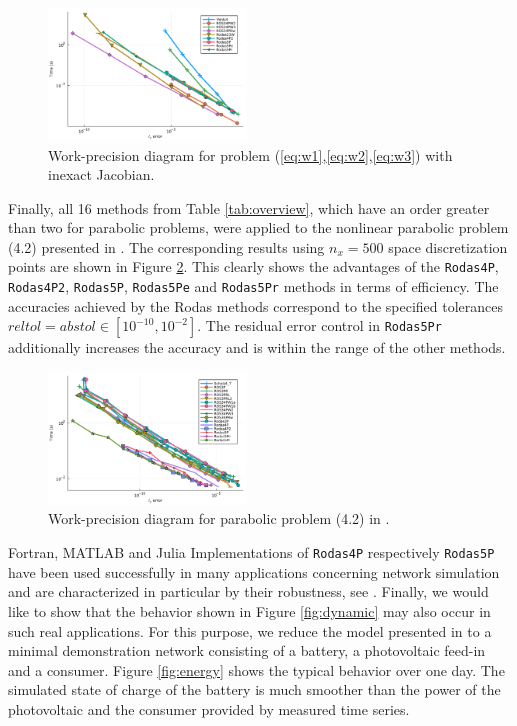 \documentclass{juliacon}
\begin{document}
\begin{figure}
 \centering
 \includegraphics[width=0.47\textwidth]{Abb4.pdf}
 \caption{Work-precision diagram for problem (\ref{eq:w1},\ref{eq:w2},\ref{eq:w3}) with inexact Jacobian.}\label{fig:benchW}
\end{figure}

Finally, all 16 methods from Table \ref{tab:overview}, which have an order greater than two for parabolic problems, were applied to the  
nonlinear parabolic problem (4.2) presented in \cite{rodas5p}. The corresponding results using $n_x=500$ space discretization points are shown in Figure \ref{fig:benchpara}. 
This clearly shows the advantages of the \verb|Rodas4P|, \verb|Rodas4P2|, \verb|Rodas5P|, \verb|Rodas5Pe| and \verb|Rodas5Pr| methods in terms of efficiency. 
The accuracies achieved by the Rodas methods correspond to the specified tolerances $reltol = abstol \in [10^{-10},10^{-2}]$. 
The residual error control in \verb|Rodas5Pr| additionally increases the accuracy and is within the range of the other methods.

\begin{figure}
 \centering
 \includegraphics[width=0.47\textwidth]{Abb5.pdf}
 \caption{Work-precision diagram for parabolic problem (4.2) in \cite{rodas5}.}\label{fig:benchpara}
\end{figure}

Fortran, MATLAB and Julia Implementations of \verb|Rodas4P| respectively \verb|Rodas5P| have been used successfully in many applications concerning network simulation and are characterized in particular 
by their robustness, see \cite{jaxsteinebach,rentropsteinebach,ecmi,dreistadtsteinebach}.
Finally, we would like to show that the behavior shown in Figure \ref{fig:dynamic} may also occur in such real applications. 
For this purpose, we reduce the model presented in \cite{flexhyx} to a minimal demonstration network consisting of a battery, a photovoltaic feed-in and a consumer.
Figure \ref{fig:energy} shows the typical behavior over one day. The simulated state of charge of the battery is much smoother than the power of the 
photovoltaic and the consumer provided by measured time series. 
\end{document}
